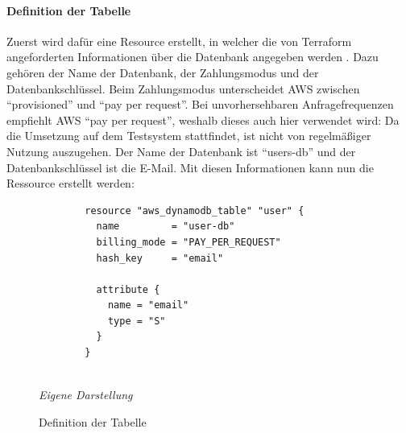 	\paragraph{Definition der Tabelle}
	Zuerst wird dafür eine Resource erstellt, in welcher die von Terraform angeforderten Informationen über die Datenbank angegeben werden \newline \cite{TerraformBestPractices2024}. Dazu gehören der Name der Datenbank, der Zahlungsmodus und der Datenbankschlüssel. Beim Zahlungsmodus unterscheidet AWS zwischen ``provisioned'' und ``pay per request''. Bei unvorhersehbaren Anfragefrequenzen empfiehlt AWS ``pay per request'', weshalb dieses auch hier verwendet wird: Da die Umsetzung auf  dem Testsystem stattfindet, ist nicht von regelmäßiger Nutzung auszugehen. Der Name der Datenbank ist ``users-db'' und der Datenbankschlüssel ist die E-Mail. Mit diesen Informationen kann nun die Ressource erstellt werden:
	
		\begin{figure}[H]
		\centering
		\begin{minipage}[t]{.7\textwidth} %
		\caption{Definition der Tabelle} %
		\begin{verbatim}
		resource "aws_dynamodb_table" "user" {
		  name         = "user-db"
		  billing_mode = "PAY_PER_REQUEST"
		  hash_key     = "email"
		
		  attribute {
		    name = "email"
		    type = "S"
		  }
		}
		
		\end{verbatim}
		
		\textit{Eigene Darstellung} %
		\label{fig:tabellenDefinition}
		\end{minipage}
		\end{figure}
